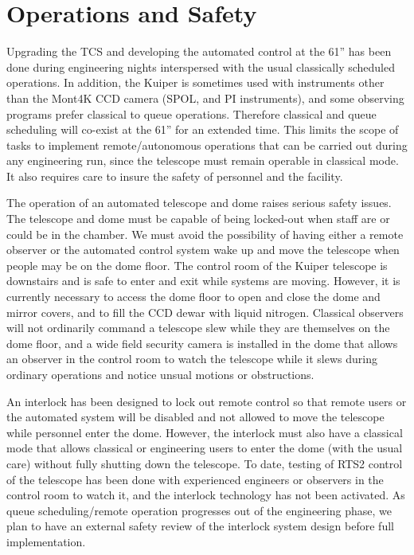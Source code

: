 \documentclass[]{spie}  %
\begin{document}
\section{Operations and Safety}

Upgrading the TCS and developing the automated control at the 61'' has been done during engineering nights interspersed with the usual classically scheduled operations.  In addition, the Kuiper is sometimes used with instruments other than the Mont4K CCD camera (SPOL, and PI instruments), and some observing programs prefer classical to queue operations. Therefore classical and queue scheduling will co-exist at the 61'' for an extended time.  This limits the scope of tasks to implement remote/autonomous operations that can be carried out during any engineering run, since the telescope must remain operable in classical mode.  It also requires care to insure the safety of personnel and the facility.

The operation of an automated telescope and dome raises serious safety issues.  The telescope and dome must be capable of being locked-out when staff are or could be in the chamber. We must avoid the possibility of having either a remote observer or the automated control system wake up and move the telescope when people may be on the dome floor.
The control room of the Kuiper telescope is downstairs and is safe to enter and exit while systems are moving. However, it is currently necessary to access the dome floor to open and close the dome and mirror covers, and to fill the CCD dewar with liquid nitrogen.  Classical observers will not ordinarily command a telescope slew while they are themselves on the dome floor, and a wide field security camera is installed in the dome that allows an observer in the control room to watch the telescope while it slews during ordinary operations and notice unsual motions or obstructions.

An interlock has been designed to lock out remote control so that remote users or the automated system will be disabled and not allowed to move the telescope while personnel enter the dome. However, the interlock must also have a classical mode that allows classical or engineering users to enter the dome (with the usual care) without fully shutting down the telescope.
To date, testing of RTS2 control of the telescope has been done with experienced engineers or observers in the control room to watch it, and the interlock technology has not been activated. As queue scheduling/remote operation progresses out of the engineering phase, we plan to have an external safety review of the interlock system design before full implementation. 
\end{document}
